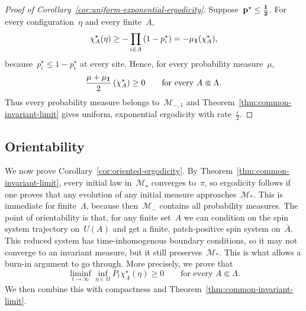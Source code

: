 \documentclass[EJP,preprint,NODS,nobera]{ejpecp}
\begin{document}
\begin{proof}[Proof of Corollary~\ref{cor:uniform-exponential-ergodicity}]
Suppose~$\mathbf{p}^\star\leq\boldsymbol{\tfrac12}$. For every configuration~$\eta$
and every finite~$A$,
\begin{equation*}
\chi_A^\star(\eta)
\geq
-\prod_{i\in A}\left(1-p_i^\star\right)
=
-\mu_{\mathbf{1}}(\chi_A^\star),
\end{equation*}
because~$p_i^\star\leq1-p_i^\star$ at every site. Hence, for every
probability measure~$\mu$,
\begin{equation*}
\frac{\mu+\mu_{\mathbf{1}}}2
\left(\chi_A^\star\right)
\geq0
\qquad
\text{for every }A\Subset\Lambda.
\end{equation*}
Thus every probability measure belongs to~$\mathcal M_{-,1}$ and
Theorem~\ref{thm:common-invariant-limit} gives uniform, exponential ergodicity with rate~$\frac{\varepsilon}{2}$.
\end{proof}

\subsection{Orientability}
\label{subsec:proof-orientability}

We now prove Corollary~\ref{cor:oriented-ergodicity}. By
Theorem~\ref{thm:common-invariant-limit}, every initial law in~$\mathcal M_\star$ converges to~$\pi$, so ergodicity follows if one proves that any evolution of any initial measure approaches~$\mathcal{M}_*$. This is immediate  for finite~$\Lambda$, because then~$\mathcal{M}_-$ contains all probability measures. The point of orientability is that,
for any finite set~$A$ we can condition on the spin system trajectory on~$U(A)$ and get a finite, patch-positive spin system on~$\bar{A}$. This reduced system has time-inhomogenous boundary conditions, so it may not converge to an invariant measure, but it still preserves~$\mathcal{M}_*$. This is what allows a burn-in argument to go through. More precisely, we prove that
\begin{equation*}
\liminf_{t\to\infty}
\inf_{\eta\in\Omega}
P_t\chi_A^\star(\eta)
\geq0
\qquad
\text{for every }A\Subset\Lambda.
\end{equation*}
We then combine this with compactness and
Theorem~\ref{thm:common-invariant-limit}.
\end{document}
